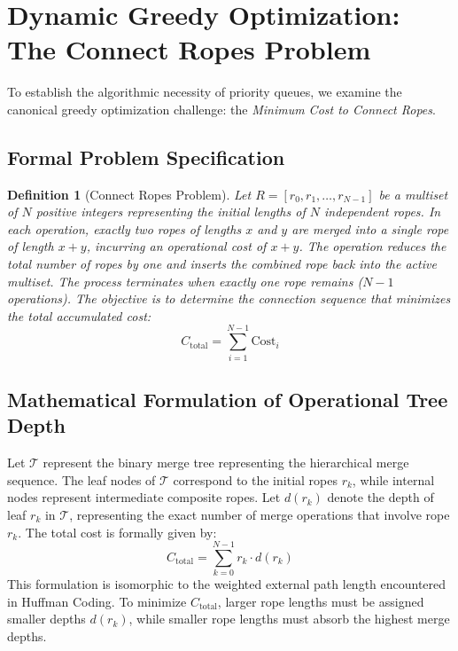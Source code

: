 \documentclass[10pt,twocolumn,letterpaper]{article}
\newtheorem{definition}[theorem]{Definition}
\begin{document}
\section{Dynamic Greedy Optimization: The Connect Ropes Problem}
\label{sec:ropes}

To establish the algorithmic necessity of priority queues, we examine the canonical greedy optimization challenge: the \emph{Minimum Cost to Connect Ropes}.

\subsection{Formal Problem Specification}
\begin{definition}[Connect Ropes Problem]
Let $R = [r_0, r_1, \dots, r_{N-1}]$ be a multiset of $N$ positive integers representing the initial lengths of $N$ independent ropes. In each operation, exactly two ropes of lengths $x$ and $y$ are merged into a single rope of length $x + y$, incurring an operational cost of $x + y$. The operation reduces the total number of ropes by one and inserts the combined rope back into the active multiset. The process terminates when exactly one rope remains ($N-1$ operations). The objective is to determine the connection sequence that minimizes the total accumulated cost:
\begin{equation}
C_{\text{total}} = \sum_{i=1}^{N-1} \text{Cost}_i
\end{equation}
\end{definition}

\subsection{Mathematical Formulation of Operational Tree Depth}
Let $\mathcal{T}$ represent the binary merge tree representing the hierarchical merge sequence. The leaf nodes of $\mathcal{T}$ correspond to the initial ropes $r_k$, while internal nodes represent intermediate composite ropes. Let $d(r_k)$ denote the depth of leaf $r_k$ in $\mathcal{T}$, representing the exact number of merge operations that involve rope $r_k$. The total cost is formally given by:
\begin{equation}
C_{\text{total}} = \sum_{k=0}^{N-1} r_k \cdot d(r_k)
\end{equation}
This formulation is isomorphic to the weighted external path length encountered in Huffman Coding. To minimize $C_{\text{total}}$, larger rope lengths must be assigned smaller depths $d(r_k)$, while smaller rope lengths must absorb the highest merge depths.
\end{document}
